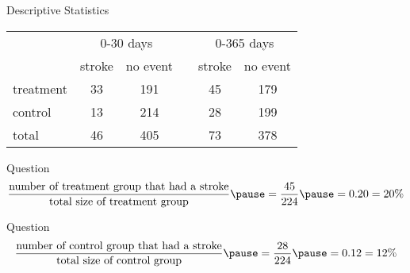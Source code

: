 \documentclass{beamer}
\begin{document}
\begin{frame}
\begin{block}{Descriptive Statistics}
\begin{center}
\begin{tabular}{lccccc}
&\multicolumn{2}{c}{0-30 days}&&\multicolumn{2}{c}{0-365 days} \\
&stroke & no event & & stroke& no event \\\hline
treatment & 33 & 191 & & 45 & 179 \\
control & 13 & 214 & & 28 & 199 \\\hline
total & 46 & 405 & & 73 & 378\\
\end{tabular}
\end{center}
\end{block}\pause

\begin{block}{Question}
\pause
\vspace{-2mm}
\begin{equation*}
\dfrac{\text{number of treatment group that had a stroke}}{\text{total size of treatment group}}\pause
=\dfrac{45}{224}\pause
 = 0.20 = 20\%
\end{equation*}
\vspace{-3mm}
\end{block}\pause
\begin{block}{Question}
\pause
\vspace{-2mm}
\begin{equation*}
\dfrac{\text{number of control group that had a stroke}}{\text{total size of control group}}\pause
= \dfrac{28}{224}\pause
 = 0.12 = 12\%
\end{equation*}
\vspace{-3mm}
\end{block}
\end{frame}
\end{document}
